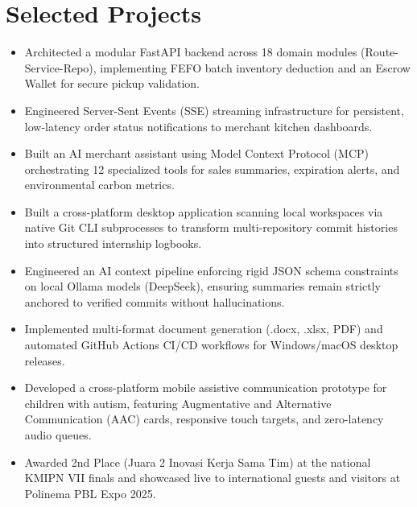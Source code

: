 \section{Selected Projects}

\begin{itemize}
  \item Architected a modular FastAPI backend across 18 domain modules (Route-Service-Repo), implementing FEFO batch inventory deduction and an Escrow Wallet for secure pickup validation.
  \item Engineered Server-Sent Events (SSE) streaming infrastructure for persistent, low-latency order status notifications to merchant kitchen dashboards.
  \item Built an AI merchant assistant using Model Context Protocol (MCP) orchestrating 12 specialized tools for sales summaries, expiration alerts, and environmental carbon metrics.
\end{itemize}

\vspace{2pt plus 2pt minus 1pt}

\begin{itemize}
  \item Built a cross-platform desktop application scanning local workspaces via native Git CLI subprocesses to transform multi-repository commit histories into structured internship logbooks.
  \item Engineered an AI context pipeline enforcing rigid JSON schema constraints on local Ollama models (DeepSeek), ensuring summaries remain strictly anchored to verified commits without hallucinations.
  \item Implemented multi-format document generation (.docx, .xlsx, PDF) and automated GitHub Actions CI/CD workflows for Windows/macOS desktop releases.
\end{itemize}

\vspace{2pt plus 2pt minus 1pt}

\begin{itemize}
  \item Developed a cross-platform mobile assistive communication prototype for children with autism, featuring Augmentative and Alternative Communication (AAC) cards, responsive touch targets, and zero-latency audio queues.
  \item Awarded 2nd Place (Juara 2 Inovasi Kerja Sama Tim) at the national KMIPN VII finals and showcased live to international guests and visitors at Polinema PBL Expo 2025.
\end{itemize}
